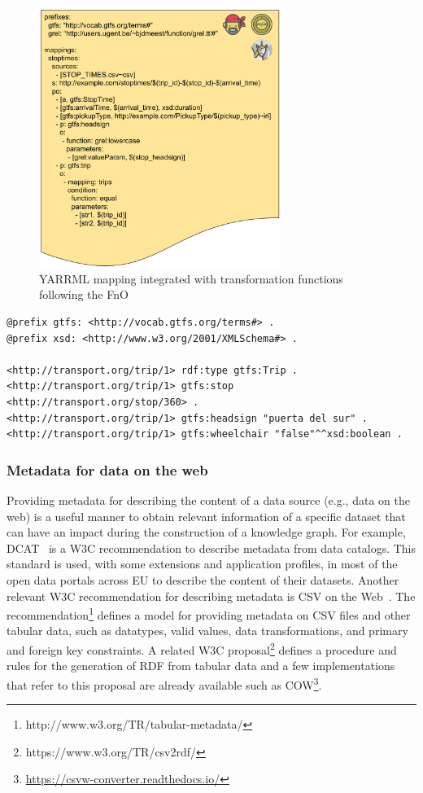\begin{figure}[!ht]
\centering
\includegraphics[width=0.7\textwidth]{figures/state-of-the-art/YARRRML+FnO.pdf}
\caption{YARRML mapping integrated with transformation functions following the FnO}
\label{fig:soa_yarrrml_fno}
\end{figure}


\begin{lstlisting}[float,caption=RDF graph generated by RML+FnO mapping,frame=tlrb,label={list:soa_fno_example}, columns=fullflexible]
@prefix gtfs: <http://vocab.gtfs.org/terms#> .
@prefix xsd: <http://www.w3.org/2001/XMLSchema#> .

<http://transport.org/trip/1> rdf:type gtfs:Trip .
<http://transport.org/trip/1> gtfs:stop <http://transport.org/stop/360> .
<http://transport.org/trip/1> gtfs:headsign "puerta del sur" .
<http://transport.org/trip/1> gtfs:wheelchair "false"^^xsd:boolean .
\end{lstlisting}

\subsubsection{Metadata for data on the web}
Providing metadata for describing the content of a data source (e.g., data on the web) is a useful manner to obtain relevant information of a specific dataset that can have an impact during the construction of a knowledge graph. For example, DCAT~\citep{maali2018data} is a W3C recommendation to describe metadata from data catalogs. This standard is used, with some extensions and application profiles, in most of the open data portals across EU to describe the content of their datasets. Another relevant W3C recommendation for describing metadata is CSV on the Web~\citep{tennison2015model}.   
The recommendation\footnote{http://www.w3.org/TR/tabular-metadata/} defines a model for providing metadata on CSV files and other tabular data, such as datatypes, valid values, data transformations, and primary and foreign key constraints. A related W3C proposal\footnote{https://www.w3.org/TR/csv2rdf/} defines a procedure and rules for the generation of RDF from tabular data and a few implementations that refer to this proposal are already available such as COW\footnote{\url{https://csvw-converter.readthedocs.io/}}.


